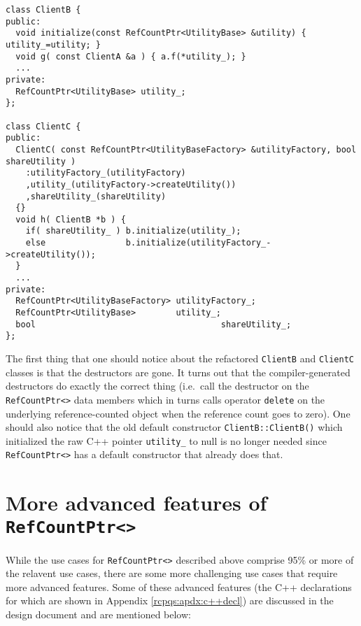 \documentclass[pdf,ps2pdf,11pt]{SANDreport}
\begin{document}
{\small\begin{verbatim}
class ClientB {
public:
  void initialize(const RefCountPtr<UtilityBase> &utility) { utility_=utility; }
  void g( const ClientA &a ) { a.f(*utility_); }
  ...
private:
  RefCountPtr<UtilityBase> utility_;
};

class ClientC {
public:
  ClientC( const RefCountPtr<UtilityBaseFactory> &utilityFactory, bool shareUtility )
    :utilityFactory_(utilityFactory)
    ,utility_(utilityFactory->createUtility())
    ,shareUtility_(shareUtility)
  {}
  void h( ClientB *b ) {
    if( shareUtility_ ) b.initialize(utility_);
    else                b.initialize(utilityFactory_->createUtility());
  }
  ...
private:
  RefCountPtr<UtilityBaseFactory> utilityFactory_;
  RefCountPtr<UtilityBase>        utility_;
  bool                                     shareUtility_;
};
\end{verbatim}}

The first thing that one should notice about the refactored
{}\texttt{ClientB} and {}\texttt{ClientC} classes is that the
destructors are gone.  It turns out that the compiler-generated
destructors do exactly the correct thing (i.e.~call the destructor on
the {}\texttt{Ref\-Count\-Ptr<>} data members which in turns calls
operator {}\texttt{delete} on the underlying reference-counted object
when the reference count goes to zero).  One should also notice that
the old default constructor {}\texttt{ClientB::ClientB()} which
initialized the raw C++ pointer {}\texttt{utility\_} to null is no
longer needed since {}\texttt{Ref\-Count\-Ptr<>} has a default
constructor that already does that.

%
\section{More advanced features of {}\texttt{Ref\-Count\-Ptr<>}}
%

While the use cases for {}\texttt{Ref\-Count\-Ptr<>} described above
comprise 95\% or more of the relavent use cases, there are some more
challenging use cases that require more advanced features.  Some of
these advanced features (the C++ declarations for which are shown in
Appendix {}\ref{rcpqs:apdx:c++decl}) are discussed in the design
document {}\cite{ref:RefCountPtr} and are mentioned below:
\end{document}

